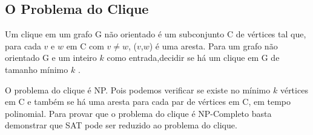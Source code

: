\subsection{O Problema do Clique}

Um clique em um grafo G não orientado é um subconjunto C de vértices tal que, para cada $v$ e $w$ em C com $v \neq w$, ($v$,$w$) é uma aresta.
Para um grafo não orientado G e um inteiro $k$ como entrada,decidir se há um clique em G de tamanho mínimo $k$ \cite{goodrichprojeto}.

O problema do clique é NP. Pois podemos verificar se existe no mínimo $k$ vértices em C e também se há uma aresta para cada par de vértices em C, em tempo polinomial. Para provar que o problema do clique é NP-Completo basta demonstrar que SAT pode ser reduzido ao problema do clique.
